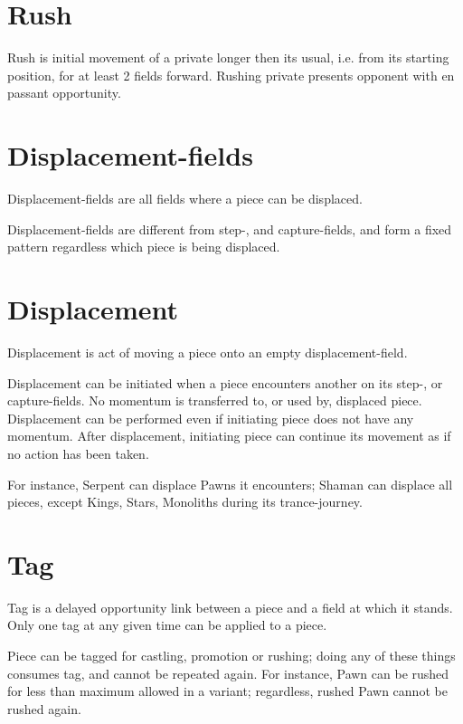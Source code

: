 \section*{Rush}
\label{sec:Terms/Rush}
Rush is initial movement of a private longer then its usual, i.e. from its starting
position, for at least 2 fields forward. Rushing private presents opponent with en
passant opportunity.

\section*{Displacement-fields}
\label{sec:Terms/Displacement-fields}
Displacement-fields are all fields where a piece can be displaced.

Displacement-fields are different from step-, and capture-fields, and form a fixed
pattern regardless which piece is being displaced.

\section*{Displacement}
\label{sec:Terms/Displacement}
Displacement is act of moving a piece onto an empty displacement-field.

Displacement can be initiated when a piece encounters another on its step-,
or capture-fields. No momentum is transferred to, or used by, displaced piece.
Displacement can be performed even if initiating piece does not have any
momentum. After displacement, initiating piece can continue its movement
as if no action has been taken.

For instance, Serpent can displace Pawns it encounters; Shaman can displace
all pieces, except Kings, Stars, Monoliths during its trance-journey.

\section*{Tag}
\label{sec:Terms/Tag}
Tag is a delayed opportunity link between a piece and a field at which it stands.
Only one tag at any given time can be applied to a piece.

Piece can be tagged for castling, promotion or rushing; doing any of these things
consumes tag, and cannot be repeated again. For instance, Pawn can be rushed for
less than maximum allowed in a variant; regardless, rushed Pawn cannot be rushed
again.

